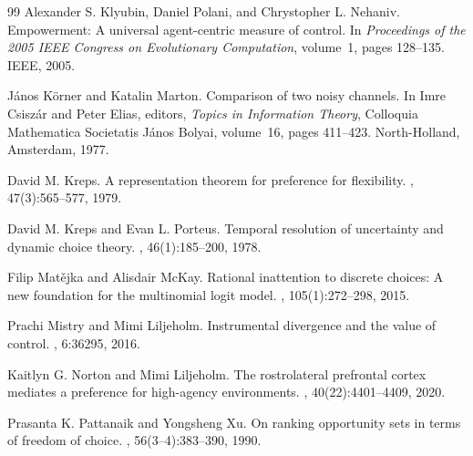 \documentclass[11pt,a4paper]{article}
\theoremstyle{definition}
\newcommand{\1}{\mathbf 1}
\begin{document}
\begin{thebibliography}{99}
Alexander S. Klyubin, Daniel Polani, and Chrystopher L. Nehaniv.
\newblock Empowerment: A universal agent-centric measure of control.
\newblock In {\em Proceedings of the 2005 IEEE Congress on Evolutionary Computation}, volume~1, pages 128--135. IEEE,
  2005.

J\'anos K\"orner and Katalin Marton.
\newblock Comparison of two noisy channels.
\newblock In Imre Csisz\'ar and Peter Elias, editors, {\em Topics in Information Theory}, Colloquia Mathematica
  Societatis J\'anos Bolyai, volume~16, pages 411--423. North-Holland, Amsterdam, 1977.

David M. Kreps.
\newblock A representation theorem for preference for flexibility.
, 47(3):565--577, 1979.

David M. Kreps and Evan L. Porteus.
\newblock Temporal resolution of uncertainty and dynamic choice theory.
, 46(1):185--200, 1978.


Filip Mat\v{e}jka and Alisdair McKay.
\newblock Rational inattention to discrete choices: A new foundation for the multinomial logit model.
, 105(1):272--298, 2015.

Prachi Mistry and Mimi Liljeholm.
\newblock Instrumental divergence and the value of control.
, 6:36295, 2016.

Kaitlyn G. Norton and Mimi Liljeholm.
\newblock The rostrolateral prefrontal cortex mediates a preference for high-agency environments.
, 40(22):4401--4409, 2020.


Prasanta K. Pattanaik and Yongsheng Xu.
\newblock On ranking opportunity sets in terms of freedom of choice.
, 56(3--4):383--390, 1990.


\end{thebibliography}
\end{document}
